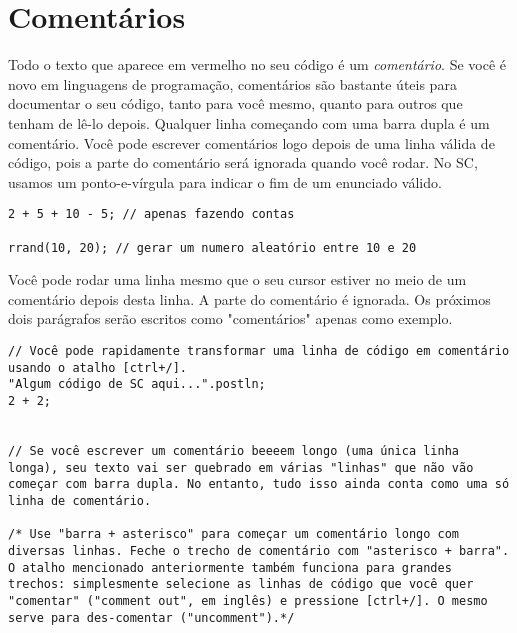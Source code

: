 \section{Comentários}

Todo o texto que aparece em vermelho no seu código é um \emph{comentário}. Se você é novo em linguagens de programação, comentários são bastante úteis para documentar o seu código, tanto para você mesmo, quanto para outros que tenham de lê-lo depois. Qualquer linha começando com uma barra dupla é um comentário. Você pode escrever comentários logo depois de uma linha válida de código, pois a parte do comentário será ignorada quando você rodar. No SC, usamos um ponto-e-vírgula para indicar o fim de um enunciado válido.

\begin{lstlisting}[style=SuperCollider-IDE, basicstyle=\scttfamily\footnotesize]
2 + 5 + 10 - 5; // apenas fazendo contas

rrand(10, 20); // gerar um numero aleatório entre 10 e 20
\end{lstlisting}

Você pode rodar uma linha mesmo que o seu cursor estiver no meio de um comentário depois desta linha. A parte do comentário é ignorada. Os próximos dois parágrafos serão escritos como "comentários" apenas como exemplo.


 
\begin{lstlisting}[style=SuperCollider-IDE, basicstyle=\scttfamily\footnotesize]
// Você pode rapidamente transformar uma linha de código em comentário usando o atalho [ctrl+/].
"Algum código de SC aqui...".postln;
2 + 2;


// Se você escrever um comentário beeeem longo (uma única linha longa), seu texto vai ser quebrado em várias "linhas" que não vão começar com barra dupla. No entanto, tudo isso ainda conta como uma só linha de comentário.

/* Use "barra + asterisco" para começar um comentário longo com diversas linhas. Feche o trecho de comentário com "asterisco + barra". O atalho mencionado anteriormente também funciona para grandes trechos: simplesmente selecione as linhas de código que você quer "comentar" ("comment out", em inglês) e pressione [ctrl+/]. O mesmo serve para des-comentar ("uncomment").*/
\end{lstlisting}
